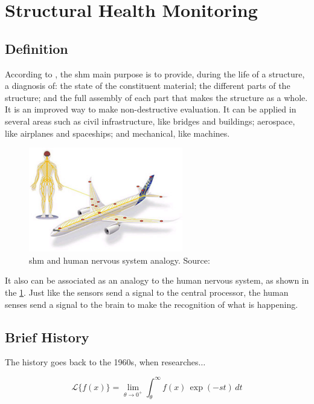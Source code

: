 \section{Structural Health Monitoring}

\subsection{Definition}

According to  \citet{balageas2010}, the \gls*{shm} main purpose is to provide, during the life of a structure,  a diagnosis of: the state of the constituent material; the different parts of the structure; and the full assembly of each part that makes the structure as a whole. 
It is an improved way to make non-destructive evaluation.
It can be applied in several areas such as civil infrastructure, like bridges and buildings; aerospace, like airplanes and spaceships; and mechanical, like machines.

\begin{figure}[H]
    \centering
    \includegraphics[width=0.6\textwidth]{figures/2methodology/shm/smh_nervous_system.png}
    \caption[SHM and human nervous system analogy]{\gls*{shm} and human nervous system analogy. Source: \citet{blanckenstein2015}}
    \label{fig:shm_nervous_system}
\end{figure}

It also can be associated as an analogy to the human nervous system, as shown in the \cref{fig:shm_nervous_system}. Just like the sensors send a signal to the central processor, the human 
senses send a signal to the brain to make the recognition of what is happening.

\subsection{Brief History}

The history goes back to the 1960s, when researches\(\ldots\) 

\begin{equation}
    \mathcal{L}\{f(x)\} = \lim_{\theta\to 0^+} \int_{\theta}^{\infty} f(x)\,\exp(-st) \, dt
\end{equation}